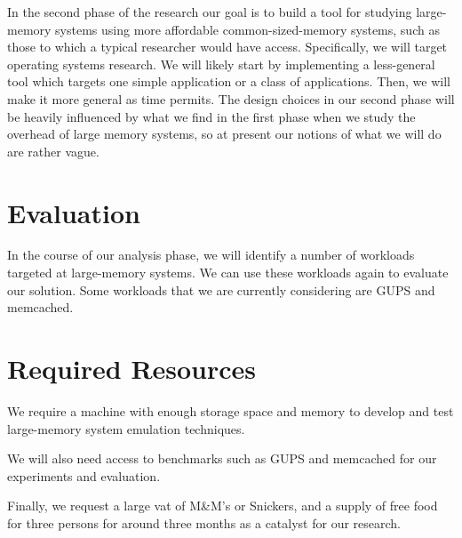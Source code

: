 \documentclass[twocolumn,11pt]{article}
\begin{document}
In the second phase of the research our goal is to build a tool for studying
large-memory systems using more affordable common-sized-memory systems, such as
those to which a typical researcher would have access. Specifically, we will
target operating systems research. We will likely start by implementing a
less-general tool which targets one simple application or a class of
applications. Then, we will make it more general as time permits. The design
choices in our second phase will be heavily influenced by what we find in the
first phase when we study the overhead of large memory systems, so at present
our notions of what we will do are rather vague.


\section{Evaluation}

In the course of our analysis phase, we will identify a number of workloads targeted at large-memory systems. We can use these workloads again to evaluate our solution. Some workloads that we are currently considering are GUPS and memcached.


\section{Required Resources}

We require a machine with enough storage space and memory to develop and test large-memory system emulation techniques.

We will also need access to benchmarks such as GUPS and memcached for our experiments and evaluation.

Finally, we request a large vat of M\&M’s or Snickers, and a supply of free food for three persons for around three months as a catalyst for our research.

{}

\end{document}
